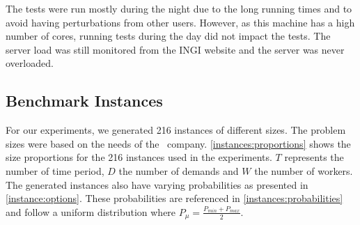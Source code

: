 \documentclass[../../thesis.tex]{subfiles}
\begin{document}
The tests were run mostly during the night due to the long running times and to avoid having 
perturbations from other users. However, as this machine has a high number of cores, running tests 
during the day did not impact the tests. 
The server load was still monitored from the INGI website \cite{jabba:monitoring} and the server was never overloaded.

\subsection{Benchmark Instances}

For our experiments, we generated 216 instances of different sizes. The problem sizes were based on the needs of the \vone\ company.
\autoref{instances:proportions} shows the size proportions for the 216 instances used in the experiments. $T$ represents the number of time period, $D$ the number of demands and $W$ the number of workers. The generated instances also have varying probabilities as presented in \autoref{instance:options}. These probabilities are referenced in \autoref{instances:probabilities} and follow a uniform distribution where $P_{\mu} = \frac{P_{min} + P_{max}}{2}$.
\end{document}
